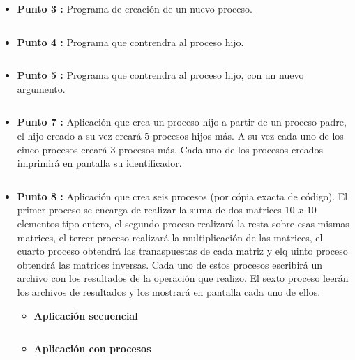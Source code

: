 \documentclass[12pt]{article}
\begin{document}
    	\begin{itemize}
    	    \item[\Checkmark] \textbf{Punto 3 :}  
                Programa de creación de un nuevo proceso.   
        	    \inputminted{octave}{Code/Windows/3.c}

            \item[\Checkmark] \textbf{Punto 4 :}
                Programa que contrendra al proceso hijo.     
                \inputminted{octave}{Code/Windows/4.c}
                
            \item[\Checkmark] \textbf{Punto 5 :}
                Programa que contrendra al proceso hijo, con un nuevo argumento.
                \inputminted{octave}{Code/Windows/5.c}

            \item[\Checkmark] \textbf{Punto 7 :}
                Aplicación que crea un proceso hijo a partir de un proceso padre, el hijo creado a su vez creará 5 procesos hijos más. A su vez cada uno de los cinco procesos creará 3 procesos más. Cada uno de los procesos creados imprimirá en pantalla su identificador.
                \inputminted{octave}{Code/Windows/6.c}

            \item[\Checkmark] \textbf{Punto 8 :}
                 Aplicación que crea seis procesos (por cópia exacta de código). El primer proceso se encarga de realizar la suma de dos matrices $10$ $x$ $10$ elementos tipo entero, el segundo proceso realizará la resta sobre esas mismas matrices, el tercer proceso realizará la multiplicación de las matrices, el cuarto proceso obtendrá las tranaspuestas de cada matriz y elq uinto proceso obtendrá las matrices inversas. Cada uno de estos procesos escribirá un archivo con los resultados de la operación que realizo. El sexto proceso leerán los archivos de resultados y los mostrará en pantalla cada uno de ellos.

                \begin{itemize}
                    \item \textbf{Aplicación secuencial}
                        \inputminted{octave}{Code/Windows/8_1.c}
                    \item \textbf{Aplicación con procesos}
                        \inputminted{octave}{Code/Windows/8_2.c}  
                \end{itemize}
            
    	\end{itemize}
    	
\end{document}
